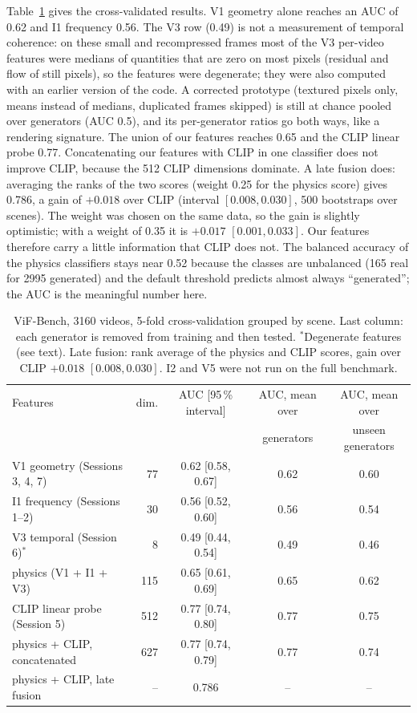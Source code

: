 \documentclass[11pt,a4paper]{article}
\begin{document}
Table~\ref{tab:clf} gives the cross-validated results. V1 geometry alone reaches an AUC of
0.62 and I1 frequency 0.56. The V3 row (0.49) is not a measurement of temporal coherence: on
these small and recompressed frames most of the V3 per-video features were medians of
quantities that are zero on most pixels (residual and flow of still pixels), so the features
were degenerate; they were also computed with an earlier version of the code. A corrected
prototype (textured pixels only, means instead of medians, duplicated frames skipped) is still
at chance pooled over generators (AUC 0.5), and its per-generator ratios go both ways, like a
rendering signature. The union of our features reaches 0.65 and the CLIP linear probe 0.77.
Concatenating our features with CLIP in one classifier does not improve CLIP, because the 512
CLIP dimensions dominate. A late fusion does: averaging the ranks of the two scores (weight
0.25 for the physics score) gives 0.786, a gain of $+0.018$ over CLIP (interval
$[0.008, 0.030]$, 500 bootstraps over scenes). The weight was chosen on the same data, so the
gain is slightly optimistic; with a weight of 0.35 it is $+0.017$ $[0.001, 0.033]$. Our
features therefore carry a little information that CLIP does not. The balanced accuracy of the physics
classifiers stays near 0.52 because the classes are unbalanced (165 real for 2995
generated) and the default threshold predicts almost always ``generated''; the AUC is the
meaningful number here.

\begin{table}[!htbp]
  \centering
  \small
  \begin{tabular}{lrccc}
    \toprule
    Features & dim. & AUC [95\,\% interval] & AUC, mean over & AUC, mean over \\
             &      &                       & generators & unseen generators \\
    \midrule
    V1 geometry (Sessions 3, 4, 7)   & 77  & 0.62 [0.58, 0.67] & 0.62 & 0.60 \\
    I1 frequency (Sessions 1--2)     & 30  & 0.56 [0.52, 0.60] & 0.56 & 0.54 \\
    V3 temporal (Session 6)$^*$      & 8   & 0.49 [0.44, 0.54] & 0.49 & 0.46 \\
    physics (V1 + I1 + V3)           & 115 & 0.65 [0.61, 0.69] & 0.65 & 0.62 \\
    CLIP linear probe (Session 5)    & 512 & 0.77 [0.74, 0.80] & 0.77 & 0.75 \\
    physics + CLIP, concatenated     & 627 & 0.77 [0.74, 0.79] & 0.77 & 0.74 \\
    physics + CLIP, late fusion      & --  & 0.786             & --   & --   \\
    \bottomrule
  \end{tabular}
  \caption{ViF-Bench, 3160 videos, 5-fold cross-validation grouped by scene. Last column:
  each generator is removed from training and then tested. $^*$Degenerate features (see text).
  Late fusion: rank average of the physics and CLIP scores, gain over CLIP $+0.018$
  $[0.008, 0.030]$. I2 and V5 were not run on the full benchmark.}
  \label{tab:clf}
\end{table}
\end{document}

